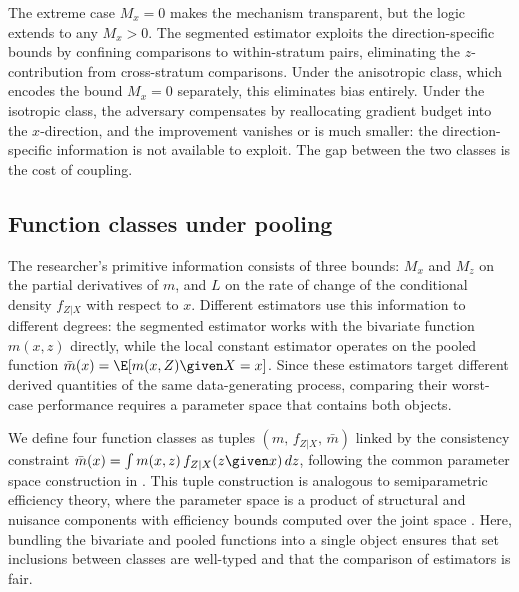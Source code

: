 
The extreme case $M_x = 0$ makes the mechanism transparent, but the logic extends to any $M_x > 0$.
The segmented estimator exploits the direction-specific bounds by confining comparisons to within-stratum pairs, eliminating the $z$-contribution from cross-stratum comparisons.
Under the anisotropic class, which encodes the bound $M_x = 0$ separately, this eliminates bias entirely.
Under the isotropic class, the adversary compensates by reallocating gradient budget into the $x$-direction, and the improvement vanishes or is much smaller: the direction-specific information is not available to exploit.
The gap between the two classes is the cost of coupling.

\subsection{Function classes under pooling}\label{sec:illustration:pooling}

The researcher's primitive information consists of three bounds: $M_x$ and $M_z$ on the partial derivatives of $m$, and $L$ on the rate of change of the conditional density $f_{Z|X}$ with respect to $x$.
Different estimators use this information to different degrees: the segmented estimator works with the bivariate function $m(x,z)$ directly, while the local constant estimator operates on the pooled function $\bar{m}(x) = \E[m(x,Z) \given X = x]$.
Since these estimators target different derived quantities of the same data-generating process, comparing their worst-case performance requires a parameter space that contains both objects.

We define four function classes as tuples $(m,\, f_{Z|X},\, \bar{m})$ linked by the consistency constraint $\bar{m}(x) = \int m(x,z)\, f_{Z|X}(z \given x)\, dz$, following the common parameter space construction in \textcite{grossbolting_heterogeneous_2026}.
This tuple construction is analogous to semiparametric efficiency theory, where the parameter space is a product of structural and nuisance components with efficiency bounds computed over the joint space \parencite[see e.g.][]{bickel_efficient_1993}.
Here, bundling the bivariate and pooled functions into a single object ensures that set inclusions between classes are well-typed and that the comparison of estimators is fair.

